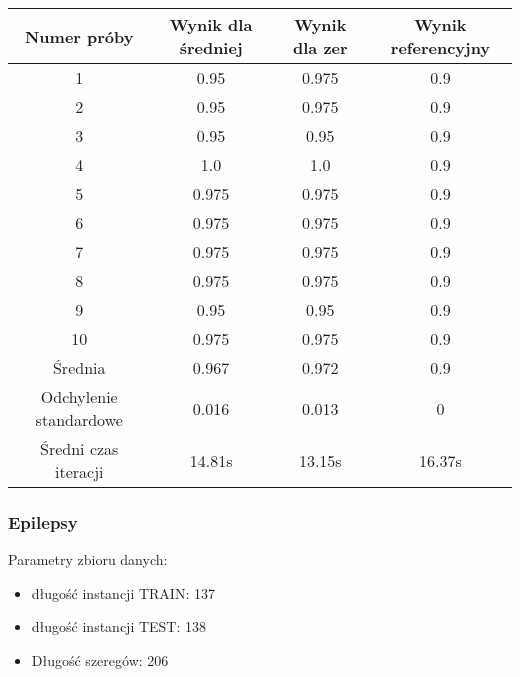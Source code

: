 \documentclass[12pt]{article}
\begin{document}
\begin{center}
\begin{tabular}{|c c c c|} 
 \hline
 Numer próby & Wynik dla średniej & Wynik dla zer & Wynik referencyjny \\ [0.5ex] 
 \hline\hline
 1 & 0.95 & 0.975 & 0.9 \\ 
 \hline
 2 & 0.95 & 0.975 & 0.9 \\
 \hline
 3 & 0.95 & 0.95 & 0.9 \\
 \hline
 4 & 1.0 & 1.0 & 0.9 \\
 \hline
  5 & 0.975 & 0.975 & 0.9 \\
 \hline
  6 & 0.975 & 0.975 & 0.9 \\
 \hline
  7 & 0.975 & 0.975 & 0.9 \\
 \hline
  8 & 0.975 & 0.975 & 0.9 \\
 \hline
  9 & 0.95 & 0.95 & 0.9 \\
 \hline
  10 & 0.975 & 0.975 & 0.9 \\
 \hline
 Średnia & 0.967 & 0.972 & 0.9 \\
 \hline
 Odchylenie standardowe & 0.016 & 0.013 & 0 \\
  \hline
 Średni czas iteracji & 14.81s & 13.15s & 16.37s \\
 \hline
\end{tabular}
\end{center}

\subsubsection*{Epilepsy}
Parametry zbioru danych:
\begin{itemize}
  \item długość instancji TRAIN: 137
  \item długość instancji TEST: 138
  \item Długość szeregów: 206
\end{itemize}
\end{document}
